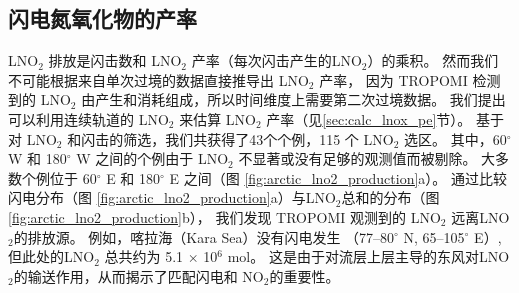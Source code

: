 \subsection{闪电氮氧化物的产率}

LNO$_2$ 排放是闪击数和 LNO$_2$ 产率（每次闪击产生的LNO$_2$）的乘积。
然而我们不可能根据来自单次过境的数据直接推导出 LNO$_2$ 产率，
因为 TROPOMI 检测到的 LNO$_2$ 由产生和消耗组成，所以时间维度上需要第二次过境数据。
我们提出可以利用连续轨道的 LNO$_2$ 来估算 LNO$_2$ 产率（见\ref{sec:calc_lnox_pe}节）。
基于对 LNO$_2$ 和闪击的筛选，我们共获得了43个个例，115 个 LNO$_2$ 选区。
其中，60$^{\circ}$ W 和 180$^{\circ}$ W 之间的个例由于 LNO$_2$ 不显著或没有足够的观测值而被剔除。
大多数个例位于 60$^{\circ}$ E 和 180$^{\circ}$ E 之间（图 \ref{fig:arctic_lno2_production}a）。
通过比较闪电分布（图 \ref{fig:arctic_lno2_production}a）与LNO$_2$总和的分布（图 \ref{fig:arctic_lno2_production}b），
我们发现 TROPOMI 观测到的 LNO$_2$ 远离LNO$_2$的排放源。
例如，喀拉海（Kara Sea）没有闪电发生 （77--80$^{\circ}$ N, 65--105$^{\circ}$ E）,
但此处的LNO$_2$ 总共约为 5.1 $\times$ 10$^6$ mol。
这是由于对流层上层主导的东风对LNO$_2$的输送作用，从而揭示了匹配闪电和 NO$_2$的重要性。


